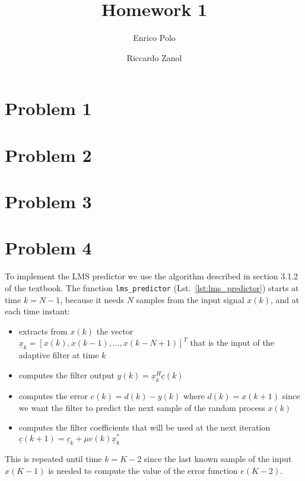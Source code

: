 \documentclass{article}
\author{Enrico Polo \and Riccardo Zanol}
\title{Homework 1}
\newcommand{\inlinecode}[1]{\lstinline[basicstyle=\ttfamily,
    keywordstyle={}]{#1}}
\renewcommand{\vec}[1]{\underline{#1}}
\begin{document}
\maketitle
\section*{Problem 1}
\section*{Problem 2}
\section*{Problem 3}
\section*{Problem 4}
To implement the LMS predictor we use the algorithm described in
section 3.1.2 of the textbook. The function \inlinecode{lms_predictor}
(Lst.~\ref{lst:lms_predictor}) starts at time $k=N-1$, because it
needs $N$ samples from the input signal $x(k)$, and at each
time instant:
\begin{itemize}
  \item extracts from $x(k)$ the vector $\vec{x}_k = [x(k),
    x(k-1),\dots,x(k-N+1)]^T$ that is the input of the adaptive filter
    at time $k$
  \item computes the filter output $y(k) = \vec{x}_k^H\vec{c}(k)$
  \item computes the error $e(k) = d(k) - y(k)$ where $d(k) = x(k+1)$
    since we want the filter to predict the next sample of the random
    process $x(k)$
  \item computes the filter coefficients that will be used at the next
    iteration $\vec{c}(k+1) = \vec{c}_k + \mu e(k) \vec{x}_k^*$
\end{itemize}
This is repeated until time $k = K - 2$ since the last known sample of
the input $x(K-1)$ is needed to compute the value of the error
function $e(K-2)$.
\end{document}
